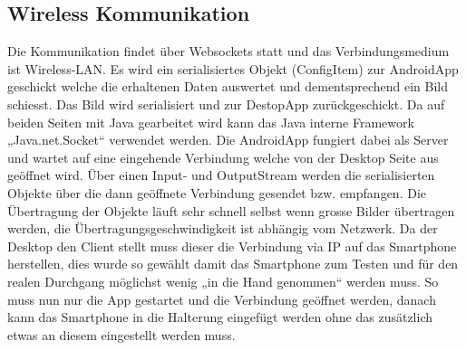 \subsection{Wireless Kommunikation}

Die Kommunikation findet über Websockets statt und das Verbindungsmedium ist Wireless-LAN. Es wird ein serialisiertes Objekt (ConfigItem) zur AndroidApp geschickt welche die erhaltenen Daten auswertet und dementsprechend ein Bild schiesst. Das Bild wird serialisiert und zur DestopApp zurückgeschickt.
Da auf beiden Seiten mit Java gearbeitet wird kann das Java interne Framework „Java.net.Socket“ verwendet werden. 
Die AndroidApp fungiert dabei als Server und wartet auf eine eingehende Verbindung welche von der Desktop Seite aus geöffnet wird. Über einen Input- und OutputStream werden die serialisierten Objekte über die dann geöffnete Verbindung gesendet bzw. empfangen. Die Übertragung der Objekte läuft sehr schnell selbst wenn grosse Bilder übertragen werden, die Übertragungsgeschwindigkeit ist abhängig vom Netzwerk. 
Da der Desktop den Client stellt muss dieser die Verbindung via IP auf das Smartphone herstellen, dies wurde so gewählt damit das Smartphone zum Testen und für den realen Durchgang möglichst wenig „in die Hand genommen“ werden muss. So muss nun nur die App gestartet und die Verbindung geöffnet werden, danach kann das Smartphone in die Halterung eingefügt werden ohne das zusätzlich etwas an diesem eingestellt werden muss. 

            
